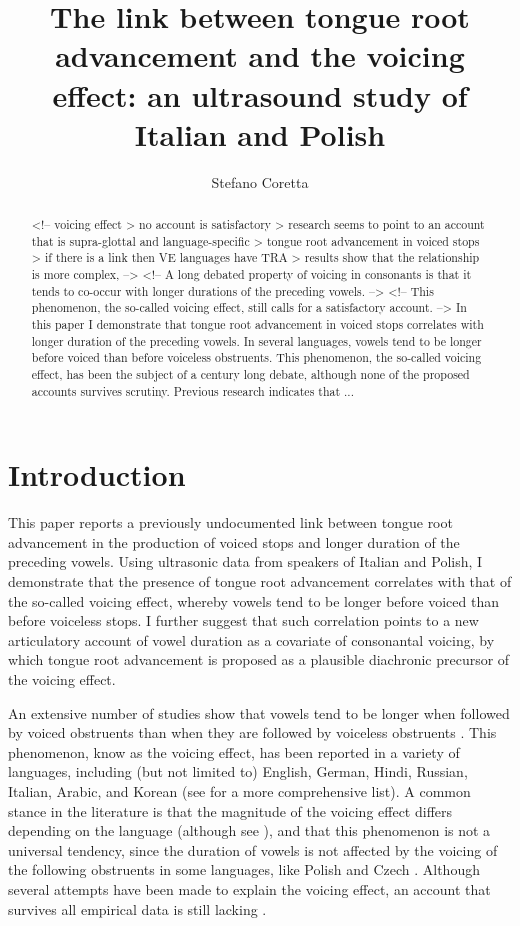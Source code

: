 \documentclass[authoryear, twocolumn]{elsarticle}
\author[mcr]{Stefano Coretta\corref{cor1}}
\title{The link between tongue root advancement and the voicing effect: an
ultrasound study of Italian and Polish}
\date{}
\begin{document}
\maketitle

\begin{abstract}
<!-- voicing effect > no account is satisfactory > research seems to point to an account that is supra-glottal and language-specific > tongue root advancement in voiced stops > if there is a link then VE languages have TRA > results show that the relationship is more complex,  -->
<!-- A long debated property of voicing in consonants is that it tends to co-occur with longer durations of the preceding vowels. -->
<!-- This phenomenon, the so-called voicing effect, still calls for a satisfactory account. -->
In this paper I demonstrate that tongue root advancement in voiced stops correlates with longer duration of the preceding vowels.
In several languages, vowels tend to be longer before voiced than before voiceless obstruents.
This phenomenon, the so-called voicing effect, has been the subject of a century long debate, although none of the proposed accounts survives scrutiny.
Previous research indicates that ...
\end{abstract}

\section{Introduction}\label{introduction}

\label{s:intro}

This paper reports a previously undocumented link between tongue root
advancement in the production of voiced stops and longer duration of the
preceding vowels. Using ultrasonic data from speakers of Italian and
Polish, I demonstrate that the presence of tongue root advancement
correlates with that of the so-called voicing effect, whereby vowels
tend to be longer before voiced than before voiceless stops. I further
suggest that such correlation points to a new articulatory account of
vowel duration as a covariate of consonantal voicing, by which tongue
root advancement is proposed as a plausible diachronic precursor of the
voicing effect.

An extensive number of studies show that vowels tend to be longer when
followed by voiced obstruents than when they are followed by voiceless
obstruents
\citep{house1953, peterson1960, chen1970, klatt1973, lisker1974, farnetani1986, fowler1992, hussein1994, esposito2002, lampp2004, durvasula2012}.
This phenomenon, know as the voicing effect, has been reported in a
variety of languages, including (but not limited to) English, German,
Hindi, Russian, Italian, Arabic, and Korean (see \citealt{maddieson1976}
for a more comprehensive list). A common stance in the literature is
that the magnitude of the voicing effect differs depending on the
language (although see \citealt{laeufer1992}), and that this phenomenon
is not a universal tendency, since the duration of vowels is not
affected by the voicing of the following obstruents in some languages,
like Polish and Czech \citep{keating1984}. Although several attempts
have been made to explain the voicing effect, an account that survives
all empirical data is still lacking \citep{durvasula2012}.
\end{document}
